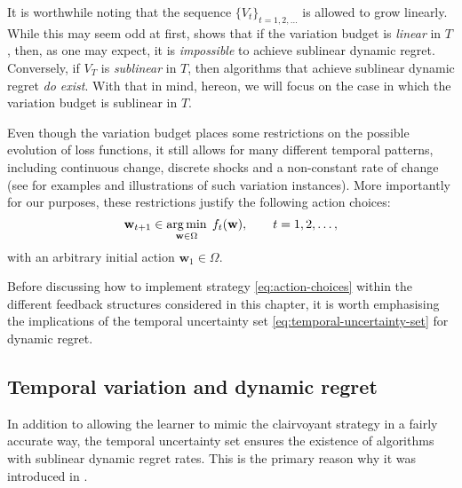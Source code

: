 \begin{mccorrection}
It is worthwhile noting that the sequence $\{V_t\}_{t=1, 2, \ldots}$ is allowed to grow linearly. While this may seem odd at first, \citep[Proposition~1]{besbes15} shows that if the variation budget is \emph{linear} in $T$, then, as one may expect, it is \emph{impossible} to achieve sublinear dynamic regret. Conversely, if $V_T$ is \emph{sublinear} in $T$, then algorithms that achieve sublinear dynamic regret \emph{do exist}. With that in mind, hereon, we will focus on the case in which the variation budget is sublinear in $T$.
\end{mccorrection}
Even though the variation budget places some restrictions on the possible evolution of loss functions, it still allows for many different temporal patterns, including continuous change, discrete shocks and a non-constant rate of change (see \citep{besbes15} for examples and illustrations of such variation instances). More importantly for our purposes, these restrictions justify the following action choices:
\begin{equation}
\label{eq:action-choices}
	\mathbf{w}_{t+1} \in \operatorname*{arg\,min}_{\mathbf{w}\in\Omega}\; f_t(\mathbf{w}), \qquad t = 1, 2, \ldots,
\end{equation}
with an arbitrary initial action $\mathbf{w}_1\in\Omega$.

Before discussing how to implement strategy \eqref{eq:action-choices} within the different feedback structures considered in this chapter, it is worth emphasising the implications of the temporal uncertainty set \eqref{eq:temporal-uncertainty-set} for dynamic regret.

\subsection{Temporal variation and dynamic regret}

In addition to allowing the learner to mimic the clairvoyant strategy in a fairly accurate way, the temporal uncertainty set ensures the existence of algorithms with sublinear dynamic regret rates. This is the primary reason why it was introduced in \citep{besbes15}.


